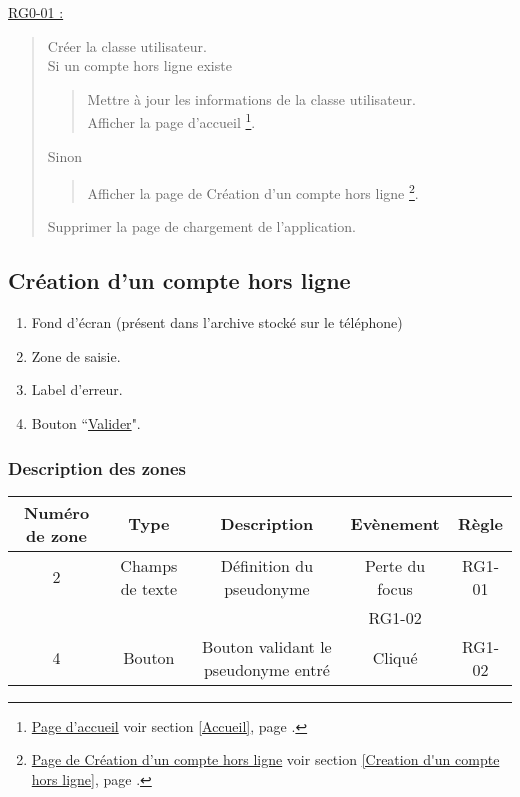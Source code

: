 \documentclass{report}
\begin{document}
		\underline{RG0-01 :}
		\begin{quote}
			Créer la classe utilisateur.\\
			Si un compte hors ligne existe
			\begin{quote}
				Mettre à jour les informations de la classe utilisateur.\\
				Afficher la page d'accueil%
				\footnote[1]{
					\hyperlink{Page d'accueil}{Page d'accueil}
					\og voir section \ref{Accueil}, page \pageref{Accueil}.\fg
				}.
			\end{quote}
			Sinon
			\begin{quote}
				Afficher la page de Création d'un compte hors ligne%
				\footnote[2]{
					\hyperlink{Création d'un compte hors ligne}{Page de Création d'un compte hors ligne}
					\og voir section \ref{Creation d'un compte hors ligne},	page \pageref{Creation d'un compte hors ligne}.\fg
				}.
			\end{quote}
			Supprimer la page de chargement de l'application.
		\end{quote}
	
\newpage

	\subsection{Création d'un compte hors ligne}
		\hypertarget{Creation d'un compte hors ligne}{}
		\label{Creation d'un compte hors ligne}

		\begin{center}
			
		\end{center}

		\begin{enumerate}
		  \item Fond d'écran (présent dans l'archive stocké sur le téléphone)
		  \item Zone de saisie.
		  \item Label d'erreur.
		  \item Bouton ``\hyperlink{Accueil}{Valider}".
		\end{enumerate}

		\subsubsection{Description des zones}
				
			\begin{tabular}{|c|c|c|c|c|} \hline
				Numéro de zone & Type  & Description & Evènement &	Règle \\\hline 
				2 & Champs de texte & Définition du pseudonyme & Perte du focus & RG1-01 \\
				  &                 &                          & RG1-02         & \\\hline
				4 & Bouton          & Bouton validant le pseudonyme entré & Cliqué & RG1-02 \\\hline
			\end{tabular}
\end{document}
